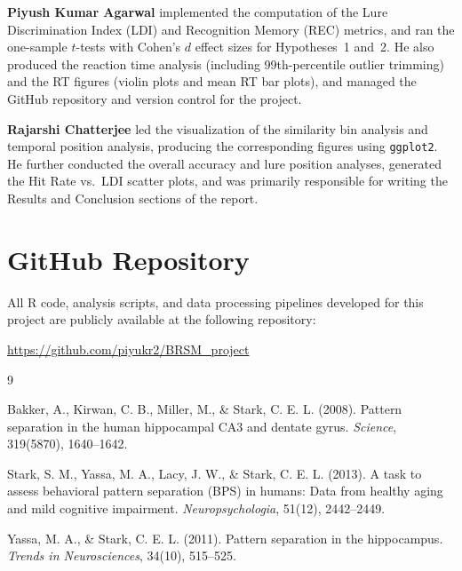\documentclass[12pt]{article}
\begin{document}
\textbf{Piyush Kumar Agarwal} implemented the computation of the Lure Discrimination Index (LDI) and Recognition Memory (REC) metrics, and ran the one-sample $t$-tests with Cohen's $d$ effect sizes for Hypotheses~1 and~2. He also produced the reaction time analysis (including 99th-percentile outlier trimming) and the RT figures (violin plots and mean RT bar plots), and managed the GitHub repository and version control for the project.

\textbf{Rajarshi Chatterjee} led the visualization of the similarity bin analysis and temporal position analysis, producing the corresponding figures using \texttt{ggplot2}. He further conducted the overall accuracy and lure position analyses, generated the Hit Rate vs.\ LDI scatter plots, and was primarily responsible for writing the Results and Conclusion sections of the report.

\newpage
\section{GitHub Repository}

All R code, analysis scripts, and data processing pipelines developed for this project are publicly available at the following repository:

\begin{center}
\url{https://github.com/piyukr2/BRSM_project}
\end{center}



\begin{thebibliography}{9}

Bakker, A., Kirwan, C. B., Miller, M., \& Stark, C. E. L. (2008).
Pattern separation in the human hippocampal CA3 and dentate gyrus.
\textit{Science}, 319(5870), 1640--1642.

Stark, S. M., Yassa, M. A., Lacy, J. W., \& Stark, C. E. L. (2013).
A task to assess behavioral pattern separation (BPS) in humans: Data from healthy aging and mild cognitive impairment.
\textit{Neuropsychologia}, 51(12), 2442--2449.

Yassa, M. A., \& Stark, C. E. L. (2011).
Pattern separation in the hippocampus.
\textit{Trends in Neurosciences}, 34(10), 515--525.

\end{thebibliography}
\end{document}
